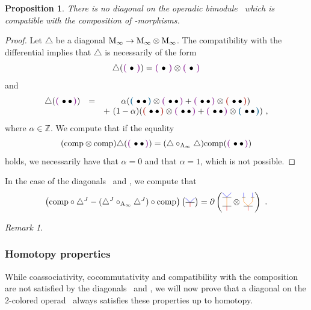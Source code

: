 \documentclass[twoside, 11pt]{amsart}
\newtheorem{proposition}[definition]{Proposition}
\theoremstyle{remark}
\newtheorem{remark}[definition]{\sc Remark}
\begin{document}
\begin{proposition} 
  \label{thm:nofunctorial}
  There is no diagonal on the operadic bimodule \Minf\ which is compatible with the composition of \Ainf -morphisms.  
\end{proposition}

\begin{proof} 
  Let $\triangle$ be a diagonal $\mathrm{M}_\infty \rightarrow \mathrm{M}_\infty \otimes \mathrm{M}_\infty$.
  The compatibility with the differential implies that $\triangle$ is necessarily of the form
  \[
      \triangle(\purple{\bullet }) = \purple{\bullet } \otimes \purple{\bullet } \]
and
\[ \begin{matrix}
      \triangle (\purple{\bullet \bullet }) &= &\alpha (\blue{\bullet \bullet }\otimes \purple{\bullet \bullet } + \purple{\bullet \bullet }\otimes\red{\bullet \bullet }) \\ & &+ \ (1-\alpha)(\red{\bullet \bullet }\otimes \purple{\bullet \bullet }+\purple{\bullet \bullet}\otimes \blue{\bullet \bullet}) \ ,
  \end{matrix} \]
  where $\alpha \in \mathbb{Z}$.
  We compute that if the equality
  \[ ( \comp \otimes \comp ) \triangle ( \purple{\bullet \bullet} ) = (\triangle \circ_{\Ainf} \triangle ) \comp  ( \purple{\bullet \bullet} ) \]
  holds, we necessarily have that $\alpha = 0$ and that $\alpha =1$, which is not possible.
\end{proof}

\noindent In the case of the diagonals \diagainf\ and \diagminf , we compute that 
  \[ \left( \comp  \circ \diagminf - (\diagminf \circ_{\Ainf} \diagminf ) \circ \comp \right) \left( \arbreopdeuxmorph  \right) = \partial \left( \arbreopcompun \otimes \arbreopcompdeux \right)  \ . \]
  
\begin{remark}
\end{remark}

\subsubsection{Homotopy properties}

While coassociativity, cocommutativity and compatibility with the composition are not satisfied by the diagonals \diagainf\ and \diagminf , we will now prove that a diagonal on the 2-colored operad \Ainfdeux\ always satisfies these properties up to homotopy.
\end{document}
